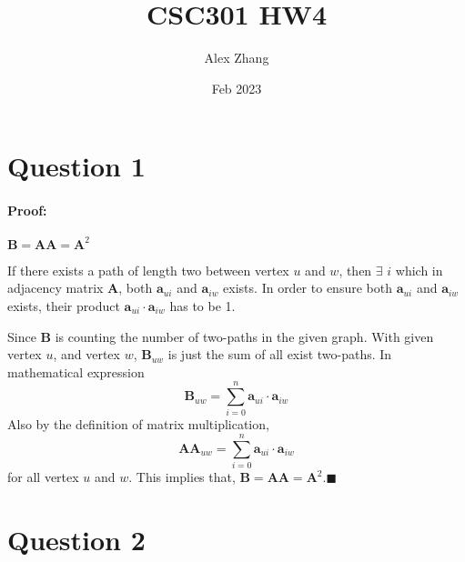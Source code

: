 \documentclass{article}
\title{CSC301 HW4}
\author{Alex Zhang}
\date{Feb 2023}
\newcommand{\mat}[1]{\mathbf{#1}}
\begin{document}
\maketitle
\section*{Question 1}
\paragraph{Proof:} $\mat{B} = \mat{A}\mat{A} = \mat{A}^2$

If there exists a path of length two between vertex $u$ and $w$, then $\exists $ $i$ which 
in adjacency matrix $\mat{A}$, both $\mat{a}_{ui}$ and $\mat{a}_{iw}$ exists.
In order to ensure both $\mat{a}_{ui}$ and $\mat{a}_{iw}$ exists, their product $\mat{a}_{ui} \cdot \mat{a}_{iw}$
has to be 1.

Since $\mat{B}$ is counting the number of two-paths in the given graph. With given vertex $u$, and vertex $w$, $\mat{B}_{uw}$
is just the sum of all exist two-paths. In mathematical expression $$\mat{B}_{uw} = \sum^{n}_{i=0}\mat{a}_{ui}\cdot \mat{a}_{iw}$$
Also by the definition of matrix multiplication, 
$$\mat{A}\mat{A}_{uw} = \sum^{n}_{i=0}\mat{a}_{ui}\cdot \mat{a}_{iw}$$
for all vertex $u$ and $w$. This implies that,
$\mat{B} = \mat{A}\mat{A} = \mat{A}^2$.$\blacksquare$

\section*{Question 2}
\end{document}
